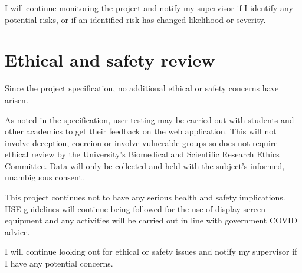\documentclass[a4paper,fleqn,12pt]{article}
\begin{document}
I will continue monitoring the project and notify my supervisor if I identify any potential risks, or if an identified risk has changed likelihood or severity.

\section{Ethical and safety review}\label{id:h.yity1y53zkk0}

Since the project specification, no additional ethical or safety concerns have arisen.

As noted in the specification, user-testing may be carried out with students and other academics to get their feedback on the web application. This will not involve deception, coercion or involve vulnerable groups so does not require ethical review by the University’s Biomedical and Scientific Research Ethics Committee. Data will only be collected and held with the subject's informed, unambiguous consent.

This project continues not to have any serious health and safety implications. HSE guidelines will continue being followed for the use of display screen equipment and any activities will be carried out in line with government COVID advice.

I will continue looking out for ethical or safety issues and notify my supervisor if I have any potential concerns.




\end{document}
